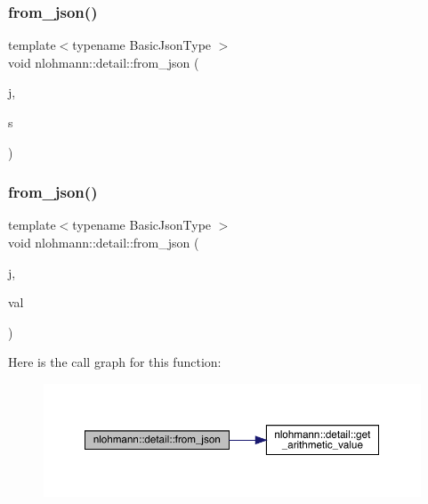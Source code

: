 \mbox{\label{namespacenlohmann_1_1detail_ad74d89f77ada7a57eff38b43d4bf2335}} 
\subsubsection{\texorpdfstring{from\_json()}{from\_json()}\hspace{0.1cm}{\footnotesize\ttfamily [2/11]}}
{\footnotesize\ttfamily template$<$typename Basic\+Json\+Type $>$ \\
void nlohmann\+::detail\+::from\+\_\+json (\begin{DoxyParamCaption}\item[{const Basic\+Json\+Type \&}]{j,  }\item[{typename Basic\+Json\+Type\+::string\+\_\+t \&}]{s }\end{DoxyParamCaption})}

\mbox{\label{namespacenlohmann_1_1detail_a7cb5dd7d46a60e65f9a8e0873b3f7dd8}} 
\subsubsection{\texorpdfstring{from\_json()}{from\_json()}\hspace{0.1cm}{\footnotesize\ttfamily [3/11]}}
{\footnotesize\ttfamily template$<$typename Basic\+Json\+Type $>$ \\
void nlohmann\+::detail\+::from\+\_\+json (\begin{DoxyParamCaption}\item[{const Basic\+Json\+Type \&}]{j,  }\item[{typename Basic\+Json\+Type\+::number\+\_\+float\+\_\+t \&}]{val }\end{DoxyParamCaption})}

Here is the call graph for this function\+:\nopagebreak
\begin{figure}[H]
\begin{center}
\leavevmode
\includegraphics[width=350pt]{namespacenlohmann_1_1detail_a7cb5dd7d46a60e65f9a8e0873b3f7dd8_cgraph}
\end{center}
\end{figure}
\mbox{\label{namespacenlohmann_1_1detail_ace4d5680ba413d9fd897ccb5d9c61a1c}} 

